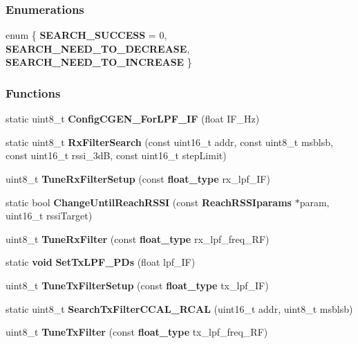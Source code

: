 \subsubsection*{Enumerations}
\begin{DoxyCompactItemize}
\item 
enum \{ {\bf S\+E\+A\+R\+C\+H\+\_\+\+S\+U\+C\+C\+E\+SS} = 0, 
{\bf S\+E\+A\+R\+C\+H\+\_\+\+N\+E\+E\+D\+\_\+\+T\+O\+\_\+\+D\+E\+C\+R\+E\+A\+SE}, 
{\bf S\+E\+A\+R\+C\+H\+\_\+\+N\+E\+E\+D\+\_\+\+T\+O\+\_\+\+I\+N\+C\+R\+E\+A\+SE}
 \}
\end{DoxyCompactItemize}
\subsubsection*{Functions}
\begin{DoxyCompactItemize}
\item 
static uint8\+\_\+t {\bf Config\+C\+G\+E\+N\+\_\+\+For\+L\+P\+F\+\_\+\+IF} (float I\+F\+\_\+\+Hz)
\item 
static uint8\+\_\+t {\bf Rx\+Filter\+Search} (const uint16\+\_\+t addr, const uint8\+\_\+t msblsb, const uint16\+\_\+t rssi\+\_\+3dB, const uint16\+\_\+t step\+Limit)
\item 
uint8\+\_\+t {\bf Tune\+Rx\+Filter\+Setup} (const {\bf float\+\_\+type} rx\+\_\+lpf\+\_\+\+IF)
\item 
static bool {\bf Change\+Until\+Reach\+R\+S\+SI} (const {\bf Reach\+R\+S\+S\+Iparams} $\ast$param, uint16\+\_\+t rssi\+Target)
\item 
uint8\+\_\+t {\bf Tune\+Rx\+Filter} (const {\bf float\+\_\+type} rx\+\_\+lpf\+\_\+freq\+\_\+\+RF)
\item 
static {\bf void} {\bf Set\+Tx\+L\+P\+F\+\_\+\+P\+Ds} (float lpf\+\_\+\+IF)
\item 
uint8\+\_\+t {\bf Tune\+Tx\+Filter\+Setup} (const {\bf float\+\_\+type} tx\+\_\+lpf\+\_\+\+IF)
\item 
static uint8\+\_\+t {\bf Search\+Tx\+Filter\+C\+C\+A\+L\+\_\+\+R\+C\+AL} (uint16\+\_\+t addr, uint8\+\_\+t msblsb)
\item 
uint8\+\_\+t {\bf Tune\+Tx\+Filter} (const {\bf float\+\_\+type} tx\+\_\+lpf\+\_\+freq\+\_\+\+RF)
\end{DoxyCompactItemize}
